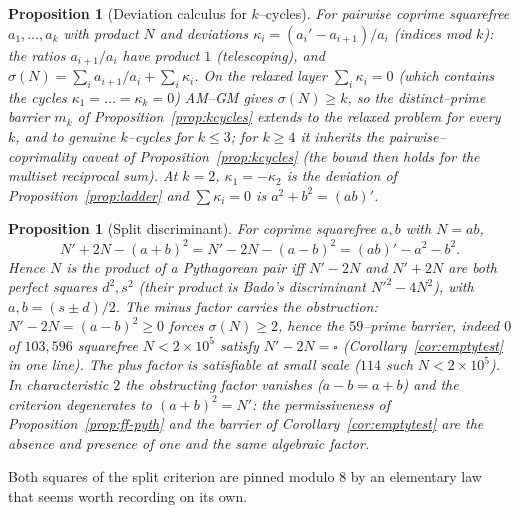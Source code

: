\documentclass[11pt]{article}
\newtheorem{proposition}[theorem]{Proposition}
\theoremstyle{definition}
\begin{document}
\begin{proposition}[Deviation calculus for $k$--cycles]\label{prop:kdev}
For pairwise coprime squarefree $a_1,\dots,a_k$ with product $N$ and deviations
$\kappa_i=(a_i'-a_{i+1})/a_i$ (indices mod $k$): the ratios $a_{i+1}/a_i$ have product $1$
(telescoping), and $\sigma(N)=\sum_i a_{i+1}/a_i+\sum_i\kappa_i$. On the relaxed layer
$\sum_i\kappa_i=0$ (which contains the cycles $\kappa_1=\dots=\kappa_k=0$) AM--GM gives
$\sigma(N)\ge k$, so the distinct--prime barrier $m_k$ of Proposition~\ref{prop:kcycles} extends to the
relaxed problem for every $k$, and to genuine $k$--cycles for $k\le3$; for $k\ge4$ it inherits the
pairwise--coprimality caveat of Proposition~\ref{prop:kcycles} (the bound then holds for the multiset
reciprocal sum). At $k=2$, $\kappa_1=-\kappa_2$ is the deviation of Proposition~\ref{prop:ladder} and
$\sum\kappa_i=0$ is $a^2+b^2=(ab)'$.
\end{proposition}

\begin{proposition}[Split discriminant]\label{prop:splitdisc}
For coprime squarefree $a,b$ with $N=ab$,
\[ N'+2N-(a+b)^2=N'-2N-(a-b)^2=(ab)'-a^2-b^2. \]
Hence $N$ is the product of a Pythagorean pair iff $N'-2N$ and $N'+2N$ are \emph{both} perfect squares
$d^2,s^2$ (their product is Bado's discriminant $N'^2-4N^2$), with $a,b=(s\pm d)/2$. The minus factor
carries the obstruction: $N'-2N=(a-b)^2\ge0$ forces $\sigma(N)\ge2$, hence the $59$--prime barrier,
indeed $0$ of $103{,}596$ squarefree $N<2\times10^5$ satisfy $N'-2N=\square$
(Corollary~\ref{cor:emptytest} in one line). The plus factor is satisfiable at small scale ($114$ such
$N<2\times10^5$). In characteristic $2$ the obstructing factor vanishes ($a-b=a+b$) and the criterion
degenerates to $(a+b)^2=N'$: the permissiveness of Proposition~\ref{prop:ff-pyth} and the barrier of
Corollary~\ref{cor:emptytest} are the absence and presence of one and the same algebraic factor.
\end{proposition}

Both squares of the split criterion are pinned modulo $8$ by an elementary law that seems worth
recording on its own.
\end{document}
